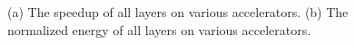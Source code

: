\begin{figure}[t]
    \centering
  
    \caption{(a) The speedup of all layers on various accelerators. (b) The normalized energy of all layers on various accelerators.}\label{fig:full_eval}
  \end{figure}